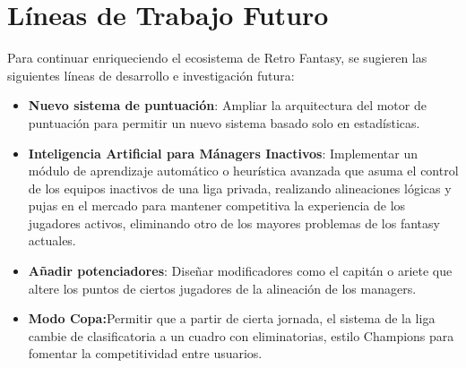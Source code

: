 \section{Líneas de Trabajo Futuro}
Para continuar enriqueciendo el ecosistema de Retro Fantasy, se sugieren las siguientes líneas de desarrollo e investigación futura:
\begin{itemize}
    \item \textbf{Nuevo sistema de puntuación}: Ampliar la arquitectura del motor de puntuación para permitir un nuevo sistema basado solo en estadísticas.
    \item \textbf{Inteligencia Artificial para Mánagers Inactivos}: Implementar un módulo de aprendizaje automático o heurística avanzada que asuma el control de los equipos inactivos de una liga privada, realizando alineaciones lógicas y pujas en el mercado para mantener competitiva la experiencia de los jugadores activos, eliminando otro de los mayores problemas de los fantasy actuales.
    \item \textbf{Añadir potenciadores}: Diseñar modificadores como el capitán o ariete que altere los puntos de ciertos jugadores de la alineación de los managers.
    \item \textbf{Modo Copa:}Permitir que a partir de cierta jornada, el sistema de la liga cambie de clasificatoria a un cuadro con eliminatorias, estilo Champions para fomentar la competitividad entre usuarios.
\end{itemize}
